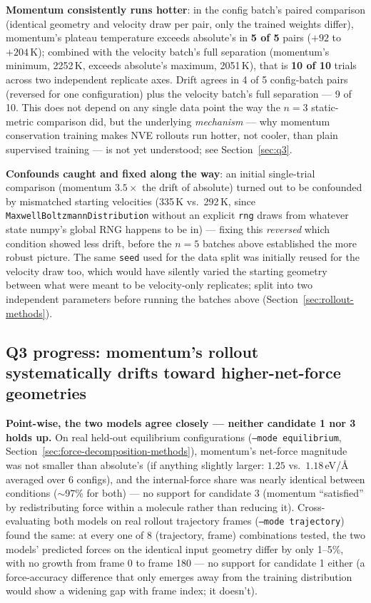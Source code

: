 \documentclass[11pt]{article}
\begin{document}
\textbf{Momentum consistently runs hotter}: in the config batch's paired
comparison (identical geometry and velocity draw per pair, only the trained
weights differ), momentum's plateau temperature exceeds absolute's in
\textbf{5 of 5} pairs ($+92$ to $+204$\,K); combined with the velocity
batch's full separation (momentum's minimum, 2252\,K, exceeds absolute's
maximum, 2051\,K), that is \textbf{10 of 10} trials across two independent
replicate axes. Drift agrees in 4 of 5 config-batch pairs (reversed for one
configuration) plus the velocity batch's full separation --- 9 of 10. This
does not depend on any single data point the way the $n=3$ static-metric
comparison did, but the underlying \emph{mechanism} --- why momentum
conservation training makes NVE rollouts run hotter, not cooler, than plain
supervised training --- is not yet understood; see Section~\ref{sec:q3}.

\textbf{Confounds caught and fixed along the way}: an initial single-trial
comparison (momentum $3.5\times$ the drift of absolute) turned out to be
confounded by mismatched starting velocities (335\,K vs.\ 292\,K, since
\texttt{MaxwellBoltzmannDistribution} without an explicit \texttt{rng} draws
from whatever state numpy's global RNG happens to be in) --- fixing this
\emph{reversed} which condition showed less drift, before the $n=5$ batches
above established the more robust picture. The same \texttt{seed} used for
the data split was initially reused for the velocity draw too, which would
have silently varied the starting geometry between what were meant to be
velocity-only replicates; split into two independent parameters before
running the batches above (Section~\ref{sec:rollout-methods}).

\subsection{Q3 progress: momentum's rollout systematically drifts toward
higher-net-force geometries}
\label{sec:q3-progress}

\textbf{Point-wise, the two models agree closely --- neither candidate 1 nor
3 holds up.} On real held-out equilibrium configurations
(\texttt{--mode equilibrium}, Section~\ref{sec:force-decomposition-methods}),
momentum's net-force magnitude was not smaller than absolute's (if anything
slightly larger: $1.25$ vs.\ $1.18$\,eV/\AA{} averaged over 6 configs), and
the internal-force share was nearly identical between conditions
($\sim$97\% for both) --- no support for candidate 3 (momentum
``satisfied'' by redistributing force within a molecule rather than reducing
it). Cross-evaluating both models on real rollout trajectory frames
(\texttt{--mode trajectory}) found the same: at every one of 8
(trajectory, frame) combinations tested, the two models' predicted forces on
the identical input geometry differ by only 1--5\%, with no growth from
frame 0 to frame 180 --- no support for candidate 1 either (a
force-accuracy difference that only emerges away from the training
distribution would show a widening gap with frame index; it doesn't).
\end{document}
